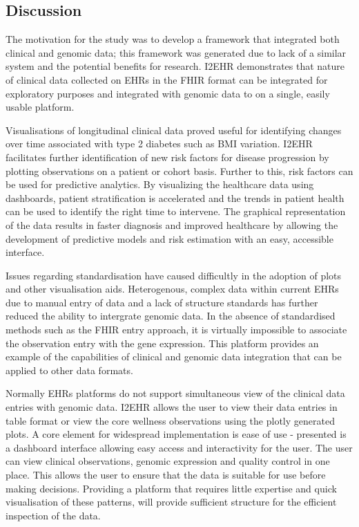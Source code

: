 \documentclass{bioinfo}
\begin{document}
\begin{Discussion}

\section{Discussion}
\enlargethispage{6pt}
The motivation for the study was to develop a framework that integrated both clinical and genomic data; this framework was generated due to lack of a similar system and the potential benefits for research. I2EHR demonstrates that nature of clinical data collected on EHRs in the FHIR format can be integrated for exploratory purposes and integrated with genomic data to on a single, easily usable platform.

Visualisations of longitudinal clinical data proved useful for identifying changes over time associated with type 2 diabetes such as BMI variation. I2EHR facilitates further identification of new risk factors for disease progression by plotting observations on a patient or cohort basis. Further to this, risk factors can be used for predictive analytics. By visualizing the healthcare data using dashboards, patient stratification is accelerated and the trends in patient health can be used to identify the right time to intervene. The graphical representation of the data results in faster diagnosis and improved healthcare by allowing the development of predictive models and risk estimation with an easy, accessible interface.  


Issues regarding standardisation have caused difficultly in the adoption of plots and other visualisation aids. Heterogenous, complex data 
within current EHRs due to manual entry of data and a lack of structure standards has further reduced the ability to intergrate genomic data. In the absence of standardised methods such as the FHIR entry approach, it is virtually impossible to associate the observation entry with the gene expression. This platform provides an example of the capabilities of clinical and genomic data integration that can be applied to other data formats.


Normally EHRs platforms do not support simultaneous view of the clinical data entries with genomic data. I2EHR allows the user to view their data entries in table format or view the core wellness observations using the plotly generated plots. A core element for widespread implementation is ease of use - presented is a dashboard interface allowing easy access and interactivity for the user. The user can view clinical observations, genomic expression and quality control in one place. This allows the user to ensure that the data is suitable for use before making decisions. Providing a platform that requires little expertise and quick visualisation of these patterns, will provide sufficient structure for the efficient inspection of the data.



\end{Discussion}
\end{document}
